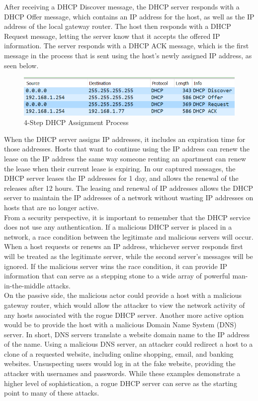 \documentclass[10pt]{IEEEtran}
\begin{document}
 After receiving a DHCP Discover message, the DHCP server responds with a DHCP Offer message, which contains an IP address for the host, as well as the IP address of the local gateway router. The host then responds with a DHCP Request message, letting the server know that it accepts the offered IP information. The server responds with a DHCP ACK message, which is the first message in the process that is sent using the host's newly assigned IP address, as seen below. 
 
 \begin{figure}[h!]

	\includegraphics[width=\linewidth]{dhcpprocess.png}
	\caption{4-Step DHCP Assignment Process}
	\label{fig:dhcpCap2}
\end{figure}

 When the DHCP server assigns IP addresses, it includes an expiration time for those addresses. Hosts that want to continue using the IP address can renew the lease on the IP address the same way someone renting an apartment can renew the lease when their current lease is expiring. In our captured messages, the DHCP server leases the IP addresses for 1 day, and allows the renewal of the releases after 12 hours. The leasing and renewal of IP addresses allows the DHCP server to maintain the IP addresses of a network without wasting IP addresses on hosts that are no longer active.\\
 
 From a security perspective, it is important to remember that the DHCP service does not use any authentication. If a malicious DHCP server is placed in a network, a race condition between the legitimate and malicious servers will occur. When a host requests or renews an IP address, whichever server responds first will be treated as the legitimate server, while the second server's messages will be ignored. If the malicious server wins the race condition, it can provide IP information that can serve as a stepping stone to a wide array of powerful man-in-the-middle attacks.\\
 
  On the passive side, the malicious actor could provide a host with a malicious gateway router, which would allow the attacker to view the network activity of any hosts associated with the rogue DHCP server. Another more active option would be to provide the host with a malicious Domain Name System (DNS) server.  In short, DNS servers translate a website domain name to the IP address of the name. Using a malicious DNS server, an attacker could redirect a host to a clone of a requested website, including online shopping, email, and banking websites. Unsuspecting users would log in at the fake website, providing the attacker with usernames and passwords. While these examples demonstrate a higher level of sophistication, a rogue DHCP server can serve as the starting point to many of these attacks.\\
 
\end{document}
